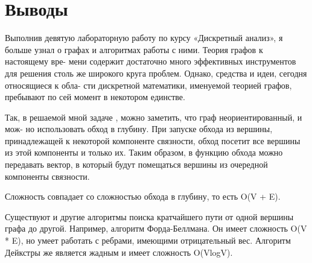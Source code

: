 \section{Выводы}

Выполнив девятую лабораторную работу по курсу «Дискретный анализ», я больше
узнал о графах и алгоритмах работы с ними. Теория графов к настоящему вре-
мени содержит достаточно много эффективных инструментов для решения столь
же широкого круга проблем. Однако, средства и идеи, сегодня относящиеся к обла-
сти дискретной математики, именуемой теорией графов, пребывают по сей момент
в некотором единстве.\newline

Так, в решаемой мной задаче , можно заметить, что граф неориентированный, и мож-
но использовать обход в глубину. При запуске обхода из вершины, принадлежащей к
некоторой компоненте связности, обход посетит все вершины из этой компоненты и
только их. Таким образом, в функцию обхода можно передавать вектор, в который
будут помещаться вершины из очередной компоненты связности.\newline

Сложность совпадает со сложностью обхода в глубину, то есть O(V + E).\newline

Существуют и другие алгоритмы поиска кратчайшего пути от одной вершины графа
до другой. Например, алгоритм Форда-Беллмана. Он имеет сложность O(V * E), но умеет работать с ребрами, имеющими отрицательный вес. Алгоритм Дейкстры же является жадным и имеет сложность O(VlogV).\newline

\pagebreak
